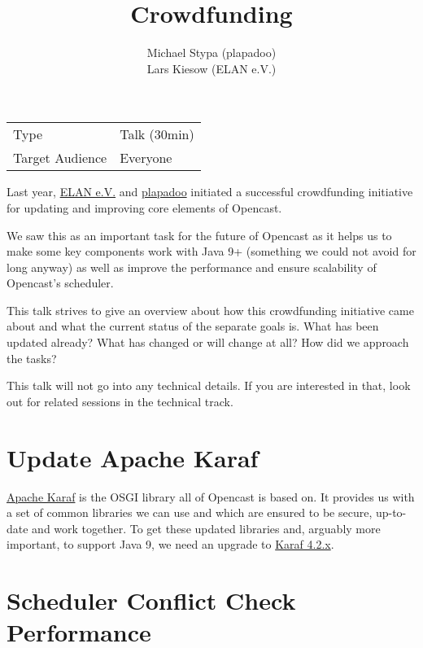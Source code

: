 \documentclass[a4paper]{article}
\title{Crowdfunding}
\author{
	Michael Stypa (plapadoo) \\
	Lars Kiesow (ELAN e.V.)
}
\begin{document}
\maketitle

\begin{center}
\begin{tabular}{ll}
\toprule
	Type            & Talk (30min) \\
	Target Audience & Everyone \\
\bottomrule
\end{tabular}
\end{center}

\vspace{1em}

Last year, \href{https://elan-ev.de}{ELAN e.V.} and
\href{https://plapadoo.com}{plapadoo} initiated a successful crowdfunding
initiative for updating and improving core elements of Opencast.

We saw this as an important task for the future of Opencast as it helps us to
make some key components work with Java 9+ (something we could not avoid for
long anyway) as well as improve the performance and ensure scalability of
Opencast's scheduler.

This talk strives to give an overview about how this crowdfunding initiative
came about and what the current status of the separate goals is. What has been
updated already? What has changed or will change at all? How did we approach
the tasks?

This talk will not go into any technical details. If you are interested in
that, look out for related sessions in the technical track.


\section*{Update Apache Karaf}

\href{https://karaf.apache.org/}{Apache Karaf} is the OSGI library all of
Opencast is based on. It provides us with a set of common libraries we can use
and which are ensured to be secure, up-to-date and work together. To get these
updated libraries and, arguably more important, to support Java 9, we
need an upgrade to \href{https://karaf.apache.org/download.html}{Karaf 4.2.x}.


\section*{Scheduler Conflict Check Performance}
\end{document}
